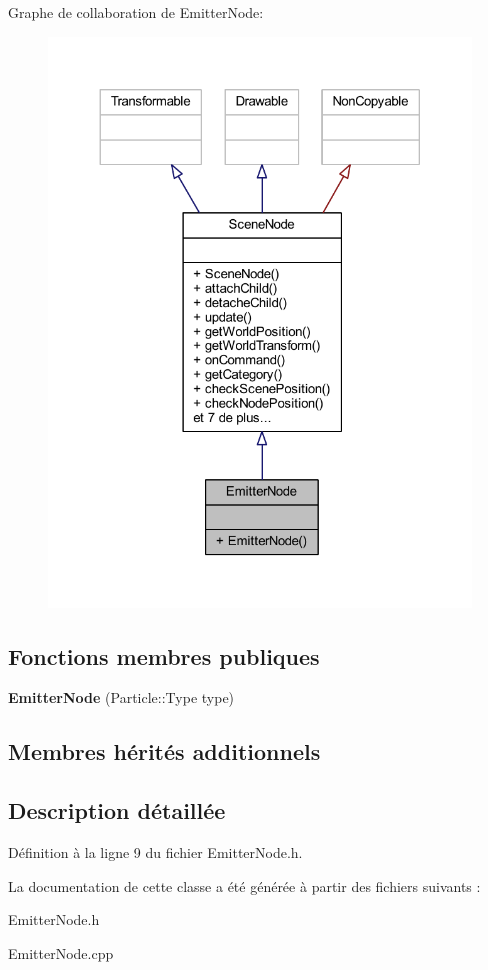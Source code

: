 Graphe de collaboration de Emitter\+Node\+:\nopagebreak
\begin{figure}[H]
\begin{center}
\leavevmode
\includegraphics[width=324pt]{class_emitter_node__coll__graph}
\end{center}
\end{figure}
\subsection*{Fonctions membres publiques}
\begin{DoxyCompactItemize}
\item 
\hypertarget{class_emitter_node_a8a6ba67d44a62d87448fab0959e15646}{}\label{class_emitter_node_a8a6ba67d44a62d87448fab0959e15646} 
{\bfseries Emitter\+Node} (Particle\+::\+Type type)
\end{DoxyCompactItemize}
\subsection*{Membres hérités additionnels}


\subsection{Description détaillée}


Définition à la ligne 9 du fichier Emitter\+Node.\+h.



La documentation de cette classe a été générée à partir des fichiers suivants \+:\begin{DoxyCompactItemize}
\item 
Emitter\+Node.\+h\item 
Emitter\+Node.\+cpp\end{DoxyCompactItemize}

